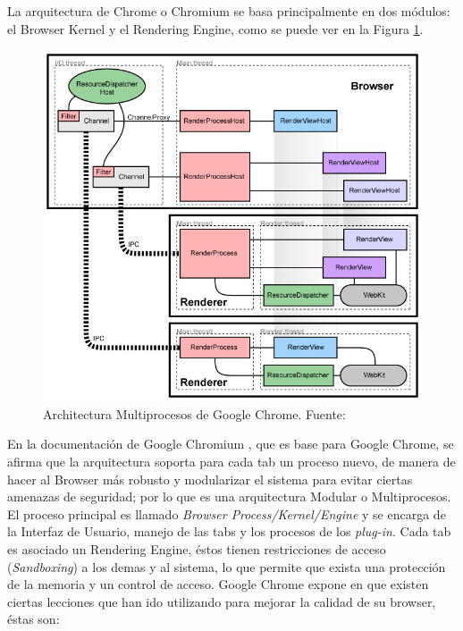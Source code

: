     La arquitectura de Chrome o Chromium se basa principalmente en dos módulos: el Browser Kernel y el Rendering Engine, como se puede ver en la Figura \ref{fig:archGC}.

    \begin{figure}[h!t]
        \centering
        \includegraphics[scale=0.65]{figures/archGC.jpg}
        \caption{Architectura Multiprocesos de Google Chrome. Fuente: \cite{multiProcGC}}
        \label{fig:archGC}
    \end{figure}

    En la documentación de Google Chromium \cite{multiProcGC}, que es base para Google Chrome, se afirma que la arquitectura soporta para cada tab un proceso nuevo, de manera de hacer al Browser más robusto y modularizar el sistema para evitar ciertas amenazas de seguridad; por lo que es una arquitectura Modular o Multiprocesos. El proceso principal es llamado \textit{Browser Process/Kernel/Engine} y se encarga de la Interfaz de Usuario, manejo de las tabs y los procesos de los \textit{plug-in}. Cada tab es asociado un Rendering Engine, éstos tienen restricciones de acceso (\textit{Sandboxing}) a los demas y al sistema, lo que permite que exista una protección de la memoria y un control de acceso. Google Chrome expone en \cite{reis2009browser} que existen ciertas lecciones que han ido utilizando para mejorar la calidad de su browser, éstas son:

